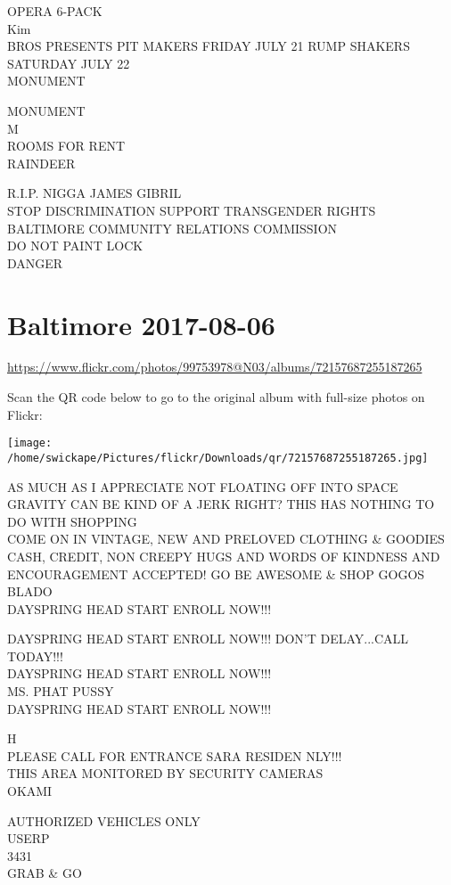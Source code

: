\documentclass[10pt,letterpaper]{article}
\begin{document}
OPERA 6{-}PACK\\
Kim\\
BROS PRESENTS PIT MAKERS FRIDAY JULY 21 RUMP SHAKERS SATURDAY JULY 22\\
MONUMENT

MONUMENT\\
M\\
ROOMS FOR RENT\\
RAINDEER

R.I.P. NIGGA JAMES GIBRIL\\
STOP DISCRIMINATION SUPPORT TRANSGENDER RIGHTS BALTIMORE COMMUNITY RELATIONS COMMISSION\\
DO NOT PAINT LOCK\\
DANGER


\section*{Baltimore 2017-08-06}

\url{https://www.flickr.com/photos/99753978@N03/albums/72157687255187265}

Scan the QR code below to go to the original album with full-size photos on Flickr:

\texttt{[image: /home/swickape/Pictures/flickr/Downloads/qr/72157687255187265.jpg]}


AS MUCH AS I APPRECIATE NOT FLOATING OFF INTO SPACE GRAVITY CAN BE KIND OF A JERK RIGHT?  THIS HAS NOTHING TO DO WITH SHOPPING\\
COME ON IN VINTAGE, NEW AND PRELOVED CLOTHING \& GOODIES CASH, CREDIT, NON CREEPY HUGS AND WORDS OF KINDNESS AND ENCOURAGEMENT ACCEPTED!  GO BE AWESOME \& SHOP GOGOS\\
BLADO\\
DAYSPRING HEAD START ENROLL NOW!!!

DAYSPRING HEAD START ENROLL NOW!!!  DON'T DELAY...CALL TODAY!!!\\
DAYSPRING HEAD START ENROLL NOW!!!\\
MS. PHAT PUSSY\\
DAYSPRING HEAD START ENROLL NOW!!!

H\\
PLEASE CALL FOR ENTRANCE SARA RESIDEN NLY!!!\\
THIS AREA MONITORED BY SECURITY CAMERAS\\
OKAMI

AUTHORIZED VEHICLES ONLY\\
USERP\\
3431\\
GRAB \& GO
\end{document}
